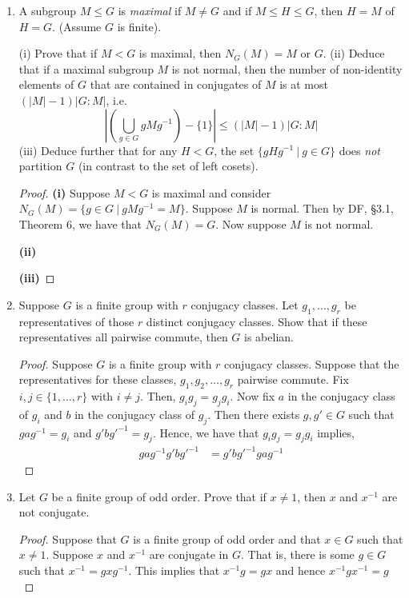 \documentclass[11pt, reqno]{amsart}
\theoremstyle{plain}
\theoremstyle{definition}
\theoremstyle{example}
\begin{document}
\begin{enumerate}[1.]
\begin{enumerate}
\begin{proof}
Thus, by DF, \S 4.3, Proposition 6, we have that the number of conjugates of $s$ in $G$ is less than or equal to $n$. Hence, the conjugacy class of $s$ (i.e. orbit of $s$ in $G$ acting on itself of conjugation) has at most $n$ elements. Since $s$ was arbitrary, this holds for every $s \in G$.
\end{proof}

\item A subgroup $M \le G$ is \emph{maximal} if $M \ne G$ and if $M \le H \le G$, then $H = M$ of $H = G$.  (Assume $G$ is finite).

(i) Prove that if $M < G$ is maximal, then  $N_G(M) = M$ or $G$. (ii) Deduce that if a maximal subgroup $M$ is not normal, then the number of non-identity elements of $G$ that are contained in conjugates of $M$ is at most $(|M|-1)|G:M|$, i.e.
$$\left| \left(\bigcup_{g \in G} g M g^{-1} \right) - \{1\} \right| \le (|M|-1)|G:M|$$
(iii) Deduce further that for any $H < G$, the set $\{gHg^{-1} ~|~ g \in G\}$ does \emph{not} partition $G$ (in contrast to the set of left cosets).
\begin{proof}

\textbf{(i)} Suppose $M < G$ is maximal and consider $N_G(M) = \{g \in G \ | \ gMg^{-1} = M\}$. Suppose $M$ is normal. Then by DF, \S 3.1, Theorem 6, we have that $N_G(M) = G$. Now suppose $M$ is not normal.


\textbf{(ii)}


\textbf{(iii)} 
\end{proof}
\item Suppose $G$ is a finite group with $r$ conjugacy classes. Let $g_1, \dots, g_r$ be representatives of those $r$ distinct conjugacy classes. Show that if these representatives all pairwise commute, then $G$ is abelian.

\begin{proof}
Suppose $G$ is a finite group with $r$ conjugacy classes. Suppose that the representatives for these classes, $g_1, g_2, \ldots, g_r$ pairwise commute. Fix $i, j \in \{1, \ldots, r\}$ with $i \neq j$. Then, $g_ig_j = g_jg_i$. Now fix $a$ in the conjugacy class of $g_i$ and $b$ in the conjugacy class of $g_j$. Then there exists $g, g' \in G$ such that $gag^{-1} = g_i$ and $g'bg'^{-1} = g_j$. Hence, we have that $g_ig_j = g_jg_i$ implies,
\begin{align*}
gag^{-1}g'bg'^{-1} &= g'bg'^{-1}gag^{-1}
\end{align*}
\end{proof}

\item Let $G$ be a finite group of odd order. Prove that if $x \ne 1$, then $x$ and $x^{-1}$ are not conjugate. 

\begin{proof}
Suppose that $G$ is a finite group of odd order and that $x \in G$ such that $x \neq 1$. Suppose $x$ and $x^{-1}$ are conjugate in $G$. That is, there is some $g \in G$ such that $x^{-1} = gxg^{-1}$. This implies that $x^{-1}g = gx$ and hence $x^{-1}gx^{-1} = g$
\end{proof}

\end{enumerate}

\end{enumerate}
\end{document}
